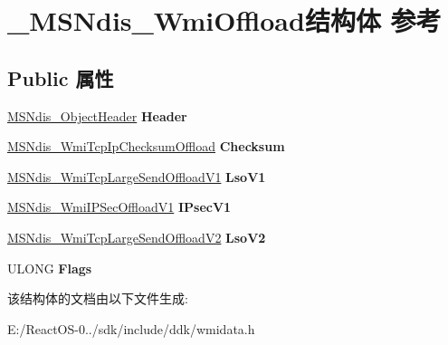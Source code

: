 \hypertarget{struct___m_s_ndis___wmi_offload}{}\section{\+\_\+\+M\+S\+Ndis\+\_\+\+Wmi\+Offload结构体 参考}
\label{struct___m_s_ndis___wmi_offload}
\subsection*{Public 属性}
\begin{DoxyCompactItemize}
\item 
\mbox{\label{struct___m_s_ndis___wmi_offload_a074edc238f3663f3b3c93f17c9c3cd4e}} 
\hyperlink{struct___m_s_ndis___object_header}{M\+S\+Ndis\+\_\+\+Object\+Header} {\bfseries Header}
\item 
\mbox{\label{struct___m_s_ndis___wmi_offload_a7fea8314eab5037004de2ca046bbff27}} 
\hyperlink{struct___m_s_ndis___wmi_tcp_ip_checksum_offload}{M\+S\+Ndis\+\_\+\+Wmi\+Tcp\+Ip\+Checksum\+Offload} {\bfseries Checksum}
\item 
\mbox{\label{struct___m_s_ndis___wmi_offload_a6087f9d49c94f115966645ef3381068c}} 
\hyperlink{struct___m_s_ndis___wmi_tcp_large_send_offload_v1}{M\+S\+Ndis\+\_\+\+Wmi\+Tcp\+Large\+Send\+Offload\+V1} {\bfseries Lso\+V1}
\item 
\mbox{\label{struct___m_s_ndis___wmi_offload_ac1400af9f92e4b724cce5f98410c6bfb}} 
\hyperlink{struct___m_s_ndis___wmi_i_p_sec_offload_v1}{M\+S\+Ndis\+\_\+\+Wmi\+I\+P\+Sec\+Offload\+V1} {\bfseries I\+Psec\+V1}
\item 
\mbox{\label{struct___m_s_ndis___wmi_offload_a279de124418669e95598b6680e8736fe}} 
\hyperlink{struct___m_s_ndis___wmi_tcp_large_send_offload_v2}{M\+S\+Ndis\+\_\+\+Wmi\+Tcp\+Large\+Send\+Offload\+V2} {\bfseries Lso\+V2}
\item 
\mbox{\label{struct___m_s_ndis___wmi_offload_adf46d775389e9f697ea68a92d9f2ffaf}} 
U\+L\+O\+NG {\bfseries Flags}
\end{DoxyCompactItemize}


该结构体的文档由以下文件生成\+:\begin{DoxyCompactItemize}
\item 
E\+:/\+React\+O\+S-\/0../sdk/include/ddk/wmidata.\+h\end{DoxyCompactItemize}
